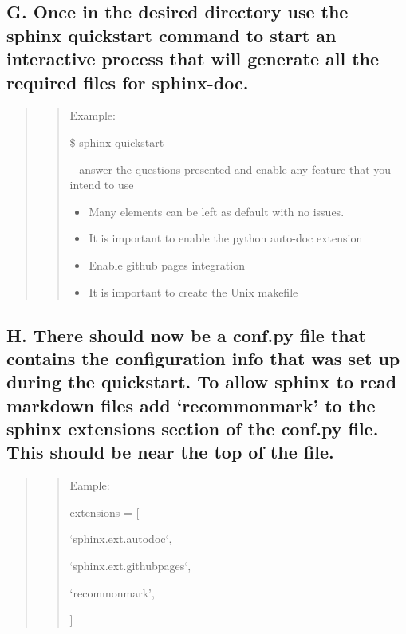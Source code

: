 \documentclass[letterpaper,10pt,english]{sphinxmanual}
\begin{document}
\subsection{G. Once in the desired directory use the sphinx quickstart command to start an interactive process that will generate all the required files for sphinx-doc.}
\label{docs/Process:g-once-in-the-desired-directory-use-the-sphinx-quickstart-command-to-start-an-interactive-process-that-will-generate-all-the-required-files-for-sphinx-doc}\begin{quote}
\begin{quote}

Example:

\$ sphinx-quickstart

-- answer the questions presented and enable any feature that you intend to use
\begin{itemize}
\item {} 
Many elements can be left as default with no issues.

\item {} 
It is important to enable the python auto-doc extension

\item {} 
Enable github pages integration

\item {} 
It is important to create the Unix makefile

\end{itemize}
\end{quote}
\end{quote}


\subsection{H. There should now be a conf.py file that contains the configuration info that was set up during the quickstart. To allow sphinx to read markdown files add ‘recommonmark’ to the sphinx extensions section of the conf.py file. This should be near the top of the file.}
\label{docs/Process:h-there-should-now-be-a-conf-py-file-that-contains-the-configuration-info-that-was-set-up-during-the-quickstart-to-allow-sphinx-to-read-markdown-files-add-recommonmark-to-the-sphinx-extensions-section-of-the-conf-py-file-this-should-be-near-the-top-of-the-file}\begin{quote}
\begin{quote}

Eample:

extensions = {[}

`sphinx.ext.autodoc`,

`sphinx.ext.githubpages`,

‘recommonmark’,

{]}
\end{quote}
\end{quote}
\end{document}
